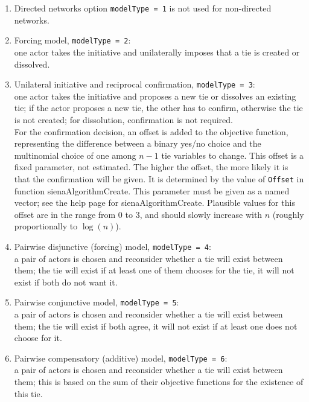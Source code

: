 \documentclass[a4paper,fleqn,11pt]{article}
\newcommand{\+}{\, + \,}
\newcommand{\sfn}[1]{\textsf{#1}}
\begin{document}
\begin{enumerate}
\item Directed networks option \texttt{modelType = 1} is not used for non-directed networks.
\item Forcing model, \texttt{modelType = 2}: \\ %
      one actor takes the initiative and unilaterally
      imposes that a tie is created or dissolved.
\item Unilateral initiative and reciprocal confirmation,
      \texttt{modelType = 3}:\\ %
      one actor takes the initiative and proposes a new tie
      or dissolves an existing tie; if the actor proposes a new tie, the other
      has to confirm, otherwise the tie is not created;
      for dissolution, confirmation is not required.\\
      For the confirmation decision, an offset is added to the objective
      function, representing the difference between a binary yes/no choice
      and the multinomial choice of one among $n-1$ tie variables to change.
      This offset is a fixed parameter, not estimated.
      The higher the offset, the more likely it is that the confirmation
      will be given. It is determined
      by the value of \texttt{Offset} in function
      \sfn{sienaAlgorithmCreate}. This parameter must be given as a
      named vector; see the help page for \sfn{sienaAlgorithmCreate}.
      Plausible values for this offset are in the range from 0 to 3,
      and should slowly increase with $n$ (roughly proportionally to $\log(n)$).

\item Pairwise disjunctive (forcing) model, \texttt{modelType = 4}:\\ %
      a pair of actors is chosen and reconsider
      whether a tie will exist between them;
      the tie will exist if at least one of them chooses for the tie,
      it will not exist if both do not want it.
\item Pairwise conjunctive model, \texttt{modelType = 5}:\\  %
      a pair of actors is chosen and reconsider
      whether a tie will exist between them;
      the tie will exist if both agree,
      it will not exist if at least one does not choose for it.
\item Pairwise compensatory (additive) model,
      \texttt{modelType = 6}:\\ %
      a pair of actors is chosen and reconsider
      whether a tie will exist between them;
      this is based on the sum of their objective functions
      for the existence of this tie.
\end{enumerate}
\end{document}
